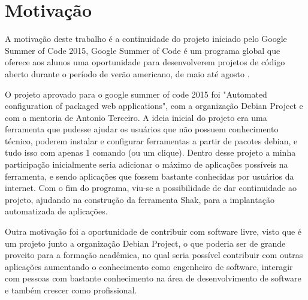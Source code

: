 \section{Motivação}
\label{sec:motivacao}
A motivação deste trabalho é a continuidade do projeto iniciado pelo Google Summer
of Code 2015, Google Summer of Code é um programa global que oferece aos
alunos uma oportunidade para desenvolverem projetos de código aberto durante o período
de verão americano, de maio até agosto \cite{gsoc2015}.

O projeto aprovado para o google summer of code 2015 foi "Automated configuration
of packaged web applications", com a organização Debian Project e com a mentoria de
Antonio Terceiro. A ideia inicial do projeto era uma ferramenta que
pudesse ajudar os usuários que não possuem conhecimento técnico, poderem
instalar e configurar ferramentas a partir de pacotes debian, e tudo isso com
apenas 1 comando (ou um clique). Dentro desse projeto a minha participação
inicialmente seria adicionar o máximo de aplicações possíveis na ferramenta,
e sendo aplicações que fossem bastante conhecidas por usuários da internet. Com o
 fim do programa, viu-se a possibilidade de dar continuidade ao projeto, ajudando
na construção da ferramenta Shak, para a implantação automatizada de aplicações.

Outra motivação foi a oportunidade de contribuir com software livre, visto que é
um projeto junto a organização Debian Project, o que poderia ser de grande proveito
para a formação acadêmica, no qual seria possível contribuir com outras
aplicações aumentando o conhecimento como engenheiro de software, interagir com
pessoas com bastante conhecimento na área de desenvolvimento de software e também
crescer como profissional.
